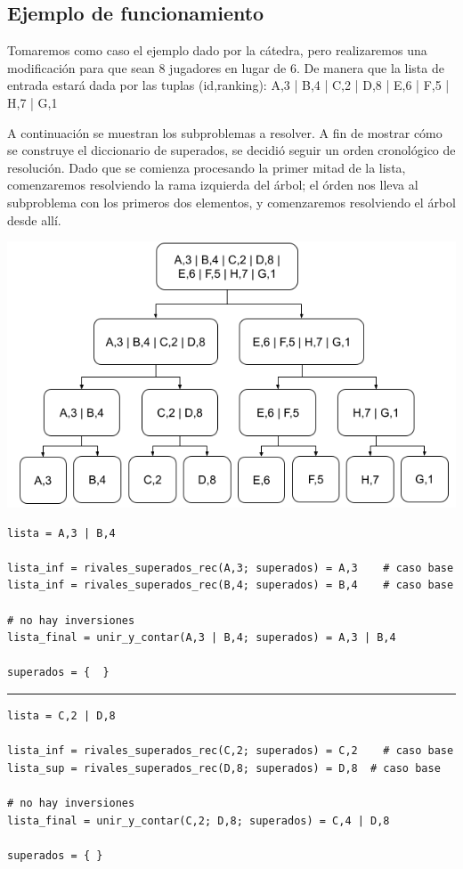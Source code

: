 \documentclass[titlepage,a4paper]{article}
\begin{document}
\subsection{Ejemplo de funcionamiento}
\label{sec:org7d9498b}

Tomaremos como caso el ejemplo dado por la cátedra, pero realizaremos una modificación para que sean 8 jugadores en lugar de 6. De manera que la lista de entrada estará dada por las tuplas (id,ranking): A,3 | B,4 | C,2 | D,8 | E,6 | F,5 | H,7 | G,1

A continuación se muestran los subproblemas a resolver. A fin de mostrar cómo se construye el diccionario de superados, se decidió seguir un orden cronológico de resolución. Dado que se comienza procesando la primer mitad de la lista, comenzaremos resolviendo la rama izquierda del árbol; el órden nos lleva al subproblema con los primeros dos elementos, y comenzaremos resolviendo el árbol desde allí.

\begin{center}
\includegraphics[width=.9\linewidth]{assets/subproblemas.png}
\end{center}

\begin{verbatim}
lista = A,3 | B,4

lista_inf = rivales_superados_rec(A,3; superados) = A,3    # caso base
lista_inf = rivales_superados_rec(B,4; superados) = B,4    # caso base

# no hay inversiones
lista_final = unir_y_contar(A,3 | B,4; superados) = A,3 | B,4

superados = {  }
\end{verbatim}

\noindent\rule{\textwidth}{0.5pt}

\begin{verbatim}
lista = C,2 | D,8

lista_inf = rivales_superados_rec(C,2; superados) = C,2    # caso base
lista_sup = rivales_superados_rec(D,8; superados) = D,8  # caso base

# no hay inversiones
lista_final = unir_y_contar(C,2; D,8; superados) = C,4 | D,8

superados = { }
\end{verbatim}
\end{document}
